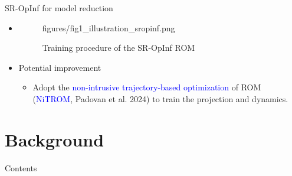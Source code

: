 \documentclass[presentation]{beamer}
\begin{document}
\begin{frame}[label={sec:orgfe01da5}]{SR-OpInf for model reduction}
\begin{itemize}
\item \begin{figure}[tbp]
\centering
\begin{tikzonimage}[width=0.9\linewidth]{figures/fig1_illustration_sropinf.png}%
\end{tikzonimage}
  \vspace{-1em}
  \caption{Training procedure of the SR-OpInf ROM}
  \label{fig:1_illustration_sropinf}
\end{figure}
\vspace{-1em}
\item Potential improvement
\begin{itemize}
\item Adopt the \textcolor{blue}{non-intrusive trajectory-based optimization} of ROM (\textcolor{blue}{NiTROM}, Padovan et al. 2024) to train the projection and dynamics.
\end{itemize}
\end{itemize}
\end{frame}

\section{Background}
\label{sec:orga013c1e}
\begin{frame}{Contents}
\end{frame}
\end{document}
